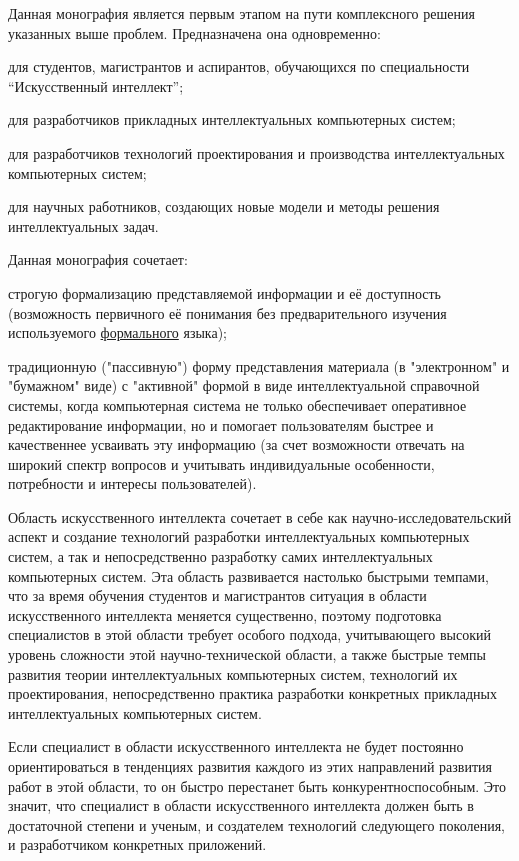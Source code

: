 {Данная монография является первым этапом на пути комплексного решения указанных выше проблем.
Предназначена она одновременно:
\begin{scnitemize}
	\item для студентов, магистрантов и аспирантов, обучающихся по специальности ``Искусственный интеллект'';
	\item для разработчиков прикладных интеллектуальных компьютерных систем;
	\item для разработчиков технологий проектирования и производства интеллектуальных компьютерных систем;
	\item для научных работников, создающих новые модели и методы решения интеллектуальных задач.
\end{scnitemize}

Данная монография сочетает:
\begin{scnitemize}
	\item строгую формализацию представляемой информации и её доступность (возможность первичного её понимания без предварительного изучения используемого \uline{формального} языка);
	\item традиционную ("пассивную"{}) форму представления материала (в "электронном"{} и "бумажном"{} виде) с "активной"{} формой в виде интеллектуальной справочной системы, когда компьютерная система не только обеспечивает оперативное редактирование информации, но и помогает пользователям  быстрее и  качественнее усваивать эту информацию (за счет возможности отвечать на широкий спектр вопросов и учитывать индивидуальные особенности, потребности и интересы пользователей). 
\end{scnitemize}

	Область искусственного интеллекта сочетает в себе как  научно-исследовательский аспект и   создание технологий разработки интеллектуальных компьютерных систем, а так и непосредственно разработку самих интеллектуальных компьютерных систем. Эта область развивается настолько быстрыми темпами, что за время обучения студентов и магистрантов ситуация в области искусственного интеллекта меняется существенно, поэтому подготовка специалистов в этой области требует особого подхода, учитывающего высокий уровень сложности этой научно-технической области, а также быстрые темпы развития теории интеллектуальных компьютерных систем, технологий их проектирования, непосредственно практика разработки конкретных прикладных интеллектуальных компьютерных систем.
	
	Если специалист в области искусственного интеллекта не будет постоянно ориентироваться в тенденциях развития каждого из этих направлений развития работ в этой области, то он быстро перестанет быть конкурентноспособным. Это значит, что специалист в области искусственного интеллекта должен быть в достаточной степени и ученым, и создателем технологий следующего поколения, и разработчиком конкретных приложений.
	
}
